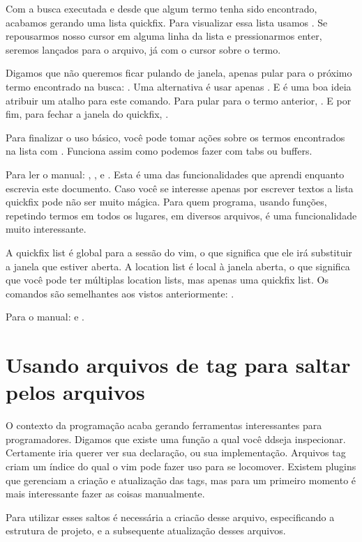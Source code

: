 
Com a busca executada e desde que algum termo tenha sido encontrado, acabamos gerando uma lista quickfix.
Para visualizar essa lista usamos .
Se repousarmos nosso cursor em alguma linha da lista e pressionarmos enter,
seremos lançados para o arquivo, já com o cursor sobre o termo.


Digamos que não queremos ficar pulando de janela, apenas pular para o próximo termo encontrado na busca: .
Uma alternativa é usar apenas . 
E é uma boa ideia atribuir um atalho para este comando.
Para pular para o termo anterior, .
E por fim, para fechar a janela do quickfix, .

Para finalizar o uso básico, você pode tomar ações sobre os termos encontrados na lista com .
Funciona assim como podemos fazer com tabs ou buffers.

Para ler o manual: , ,  e .
Esta é uma das funcionalidades que aprendi enquanto escrevia este documento.
Caso você se interesse apenas por escrever textos a lista quickfix pode não ser muito mágica.
Para quem programa, usando funções, repetindo termos em todos os lugares, em diversos arquivos,
é uma funcionalidade muito interessante.

A quickfix list é global para a sessão do vim, o que significa que ele irá substituir a janela que estiver aberta.
A location list é local à janela aberta, o que significa que você pode ter múltiplas location lists, mas apenas uma quickfix list.
Os comandos são semelhantes aos vistos anteriormente:    .

Para o manual:   e .

\section{Usando arquivos de tag para saltar pelos arquivos}
O contexto da programação acaba gerando ferramentas interessantes para programadores.
Digamos que existe uma função a qual você ddseja inspecionar.
Certamente iria querer ver sua declaração, ou sua implementação.
Arquivos tag criam um índice do qual o vim pode fazer uso para se locomover.
Existem plugins que gerenciam a criação e atualização das tags,
mas para um primeiro momento é mais interessante fazer as coisas manualmente.

Para utilizar esses saltos é necessária a criacão desse arquivo,
especificando a estrutura de projeto,
e a subsequente atualização desses arquivos.

\newpage
